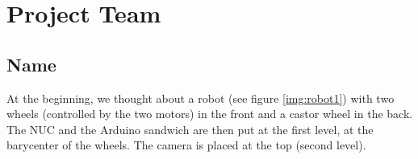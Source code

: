 \section{Project Team}

\subsection{Name}
At the beginning, we thought about a robot (see figure \ref{img:robot1}) with two wheels (controlled by the two motors) in the front and a castor wheel in the back. The NUC and the Arduino sandwich are then put at the first level, at the barycenter of the wheels. The camera is placed at the top (second level).
